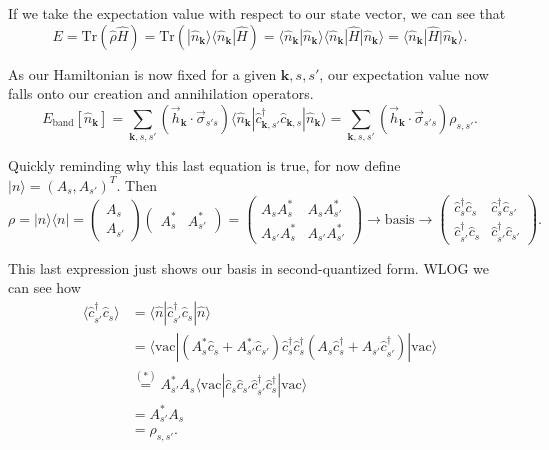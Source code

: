 \documentclass[12pt]{revtex4-2}
\newcommand{\Tr}{\text{Tr}}
\begin{document}
If we take the expectation value with respect to our state vector, we can see that 
\begin{equation}
    E = \Tr(\hat{\rho} \hat{H}) = \Tr(|\hat{n}_\mathbf{k}\rangle \langle \hat{n}_\mathbf{k}| \hat{H}) = \langle \hat{n}_\mathbf{k} | \hat{n}_\mathbf{k}\rangle \langle \hat{n}_\mathbf{k}| \hat{H} | \hat{n}_\mathbf{k} \rangle = \langle \hat{n}_\mathbf{k}| \hat{H} | \hat{n}_\mathbf{k} \rangle.
\end{equation}

As our Hamiltonian is now fixed for a given $\mathbf{k},s,s'$, our expectation value now falls onto our creation and annihilation operators.
\begin{equation}\label{eqn:en_band}
    E_\text{band}[\hat{n}_\mathbf{k}] = \sum_{\mathbf{k},s,s'} (\vec{h}_\mathbf{k} \cdot \vec{\sigma}_{s's}) \langle \hat{n}_\mathbf{k}| \hat{c}_{\mathbf{k},s'}^\dagger \hat{c}_{\mathbf{k},s} | \hat{n}_\mathbf{k} \rangle = \sum_{\mathbf{k},s,s'} (\vec{h}_\mathbf{k} \cdot \vec{\sigma}_{s's}) \rho_{s,s'}.
\end{equation}

Quickly reminding why this last equation is true, for now define $|n\rangle = (A_s,A_{s'})^T$.  Then
\begin{equation}
    \rho = |n\rangle \langle n| = \begin{pmatrix}
        A_s \\ A_{s'}
    \end{pmatrix} \begin{pmatrix}
        A_s^* & A_{s'}^*
    \end{pmatrix} = \begin{pmatrix}
        A_s A_s^* & A_s A_{s'}^* \\
        A_{s'}A_s^* & A_{s'}A_{s'}^*
    \end{pmatrix} \to \text{basis} \to \begin{pmatrix}
        \hat{c}_s^\dagger \hat{c}_s & \hat{c}_s^\dagger \hat{c}_{s'} \\
        \hat{c}_{s'}^\dagger \hat{c}_s & \hat{c}_{s'}^\dagger \hat{c}_{s'}
    \end{pmatrix}.
\end{equation}

This last expression just shows our basis in second-quantized form.  WLOG we can see how 
\begin{align}
    \langle \hat{c}_{s'}^\dagger \hat{c}_s \rangle  &= \langle \hat{n}| \hat{c}_{s'}^\dagger \hat{c}_s | \hat{n} \rangle \\
    &= \langle\text{vac}| (A_s^*\hat{c}_s + A_{s'}^*\hat{c}_{s'}) \hat{c}_s^\dagger \hat{c}_s^\dagger (A_s\hat{c}_s^\dagger + A_{s'}\hat{c}_{s'}^\dagger) | \text{vac} \rangle \\
    &\overset{(*)}{=} A_{s'}^*A_s \langle \text{vac} | \hat{c}_s \hat{c}_{s'} \hat{c}_{s'}^\dagger \hat{c}_s^\dagger | \text{vac}\rangle \\
    &= A_{s'}^*A_s \\
    &= \rho_{s,s'}.
\end{align}
\end{document}
